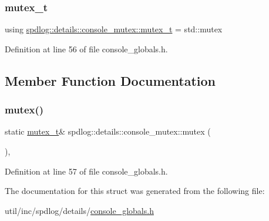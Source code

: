 \subsubsection{\texorpdfstring{mutex\+\_\+t}{mutex\_t}}
{\footnotesize\ttfamily using \hyperlink{structspdlog_1_1details_1_1console__mutex_a8c47cc70b6f1c3c7ddda2f919e4fae53}{spdlog\+::details\+::console\+\_\+mutex\+::mutex\+\_\+t} =  std\+::mutex}



Definition at line 56 of file console\+\_\+globals.\+h.



\subsection{Member Function Documentation}
\mbox{\label{structspdlog_1_1details_1_1console__mutex_a0eca5de786748bdfe509966a54b4d32f}} 
\subsubsection{\texorpdfstring{mutex()}{mutex()}}
{\footnotesize\ttfamily static \hyperlink{structspdlog_1_1details_1_1console__mutex_a8c47cc70b6f1c3c7ddda2f919e4fae53}{mutex\+\_\+t}\& spdlog\+::details\+::console\+\_\+mutex\+::mutex (\begin{DoxyParamCaption}{ }\end{DoxyParamCaption})\hspace{0.3cm}{\ttfamily [inline]}, {\ttfamily [static]}}



Definition at line 57 of file console\+\_\+globals.\+h.



The documentation for this struct was generated from the following file\+:\begin{DoxyCompactItemize}
\item 
util/inc/spdlog/details/\hyperlink{console__globals_8h}{console\+\_\+globals.\+h}\end{DoxyCompactItemize}
